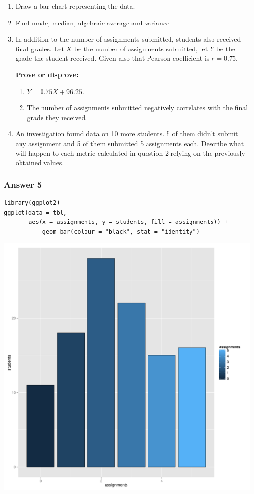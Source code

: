 \documentclass[11pt]{article}
\begin{document}
\begin{enumerate}
\item Draw a bar chart representing the data.
\item Find mode, median, algebraic average and variance.
\item In addition to the number of assignments submitted, students
also received final grades.  Let $X$ be the number of assignments
submitted, let $Y$ be the grade the student received.  Given also that
Pearson coefficient is $r=0.75$.

\textbf{Prove or disprove:}
\begin{enumerate}
\item $Y = 0.75X + 96.25$.
\item The number of assignments submitted negatively correlates with
the final grade they received.
\end{enumerate}

\item An investigation found data on 10 more students.  5 of them didn't
submit any assignment and 5 of them submitted 5 assignments each.
Describe what will happen to each metric calculated in question 2 relying
on the previously obtained values.
\end{enumerate}

\subsubsection{Answer 5}
\label{sec-1-2-1}
\lstset{language=R,label=assignments-histogram,numbers=none}
\begin{lstlisting}
library(ggplot2)
ggplot(data = tbl, 
       aes(x = assignments, y = students, fill = assignments)) +
           geom_bar(colour = "black", stat = "identity")
\end{lstlisting}

\includegraphics[width=.9\linewidth]{images/assignments.pdf}
\end{document}
